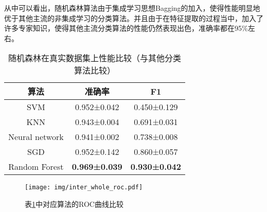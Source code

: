 \documentclass[main.tex]{subfiles}
\begin{document}
从中可以看出，随机森林算法由于集成学习思想Bagging的加入，使得性能明显地
优于其他主流的非集成学习的分类算法。并且由于在特征提取的过程当中，加入了
许多专家知识，使得其他主流分类算法的性能仍然表现出色，准确率都在95\%左右。

\begin{table}[]
    \caption{随机森林在真实数据集上性能比较（与其他分类算法比较）}
    \label{compare_other}
    \centering
    \begin{tabular}{ccc}
    \hline
    算法             & 准确率                  & F1          \\ \hline
    SVM            & 0.952±0.042          & 0.450±0.129 \\
    KNN            & 0.943±0.004          & 0.691±0.031 \\
    Neural network & 0.941±0.002          & 0.738±0.008 \\
    SGD            & 0.952±0.142          & 0.860±0.057 \\ \hline
    Random Forest             & \textbf{0.969±0.039} & \textbf{0.930±0.042} \\ \hline
    \end{tabular}
\end{table}

\begin{figure}[htbp!]
    \centering \texttt{[image: img/inter\_whole\_roc.pdf]} 
    \caption{表\ref{compare_other}中对应算法的ROC曲线比较}
    \label{roc_2}
\end{figure}
\end{document}

